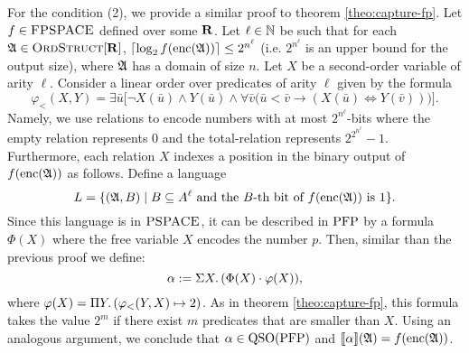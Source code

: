 For the condition (2), we provide a similar proof to theorem \ref{theo:capture-fp}. Let $f\in \text{\sc FPSPACE}$ defined over some $\mathbf{R}$. Let $\ell\in\mathbb{N}$ be such that for each $\mathfrak{A}\in\text{\sc OrdStruct}[\mathbf{R}]$, $\lceil\log_2 f({\rm enc}(\mathfrak{A})) \rceil \leq 2^{n^\ell}$ (i.e. $2^{n^\ell}$ is an upper bound for the output size), where $\mathfrak{A}$ has a domain of size $n$. Let $X$ be a second-order variable of arity $\ell$. Consider a linear order over predicates of arity $\ell$ given by the formula 
$$
\varphi_{<}(X,Y) = \exists\bar{u}\big[\neg X(\bar{u})\wedge Y(\bar{u})\wedge \forall\bar{v}\big(
\bar{u}<\bar{v}\to(X(\bar{u})\iff Y(\bar{v}))\big)\big].
$$
Namely, we use relations to encode numbers with at most $2^{n^\ell}$-bits where the empty relation represents $0$ and the total-relation represents $2^{2^{n^\ell}}-1$.
Furthermore, each relation $X$ indexes a position in the binary output of $f({\rm enc}(\mathfrak{A}))$ as follows.
Define a language
\[
L = \{(\mathfrak{A},B)\mid B \subseteq A^{\ell}\text{ and the $B$-th bit of $f({\rm enc}(\mathfrak{A}))$ is 1}\}.
\]
Since this language is in $\text{\sc PSPACE}$, it can be described in ${\rm PFP}$ \cite{AbiteboulV89} by a formula $\Phi(X)$ where the free variable $X$ encodes the number $p$. Then, similar than the previous proof we define:
$$
\alpha := \Sigma{X}.\,(\Phi(X)\cdot\varphi(X)),
$$ 
where $\varphi(X) = \Pi{Y}.\,(\varphi_{<}(Y,X)\mapsto 2)$. As in theorem \ref{theo:capture-fp}, this formula takes the value $2^m$ if there exist $m$ predicates that are smaller than $X$. Using an analogous argument, we conclude that $\alpha\in{\rm QSO}({\rm PFP})$ and ${\llbracket{}{\alpha}\rrbracket}(\mathfrak{A}) = f({\rm enc}(\mathfrak{A}))$.